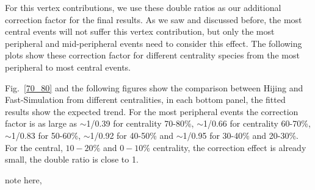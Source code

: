 \begin{figure}
\end{figure}

For this vertex contributions, we use these double ratios as our additional correction factor for the final results. As we saw and discussed before, the most central events will not suffer this vertex contribution, but only the most peripheral and mid-peripheral events need to consider this effect. The following plots show these correction factor for different centrality species from the most peripheral to most central events.


Fig.~\ref{70_80} and the following figures show the comparison between Hijing and Fast-Simulation from different centralities, in each bottom panel, the fitted results show the expected trend. For the most peripheral events the correction factor is as large as $\sim$1/0.39 for centrality 70-80\%, $\sim$1/0.66 for centrality 60-70\%, $\sim$1/0.83 for 50-60\%, $\sim$1/0.92 for 40-50\% and $\sim$1/0.95 for 30-40\% and 20-30\%. For the central, $10-20\%$ and $0-10\%$ centrality, the correction effect is already small, the double ratio is close to 1. $ $

note here,

